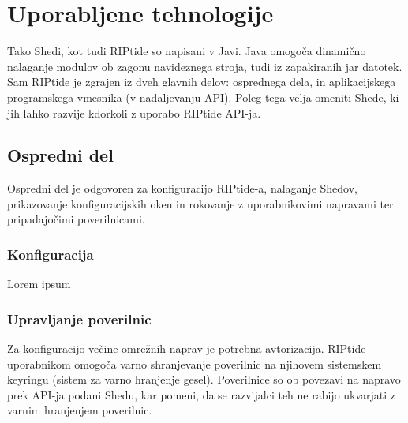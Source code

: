 \documentclass[12pt]{article}
\begin{document}
\section{Uporabljene tehnologije}
Tako Shedi, kot tudi RIPtide so napisani v Javi. Java omogoča dinamično nalaganje modulov ob zagonu navideznega stroja, tudi iz zapakiranih jar datotek. Sam RIPtide je zgrajen iz dveh glavnih delov: osprednega dela, in aplikacijskega programskega vmesnika (v nadaljevanju API). Poleg tega velja omeniti Shede, ki jih lahko razvije kdorkoli z uporabo RIPtide API-ja.

\subsection{Ospredni del}
Ospredni del je odgovoren za konfiguracijo RIPtide-a, nalaganje Shedov, prikazovanje konfiguracijskih oken in rokovanje z uporabnikovimi napravami ter pripadajočimi poverilnicami.

\subsubsection{Konfiguracija}
Lorem ipsum

\subsubsection{Upravljanje poverilnic}
Za konfiguracijo večine omrežnih naprav je potrebna avtorizacija. RIPtide uporabnikom omogoča varno shranjevanje poverilnic na njihovem sistemskem keyringu (sistem za varno hranjenje gesel). Poverilnice so ob povezavi na napravo prek API-ja podani Shedu, kar pomeni, da se razvijalci teh ne rabijo ukvarjati z varnim hranjenjem poverilnic.
\newpage
\end{document}
